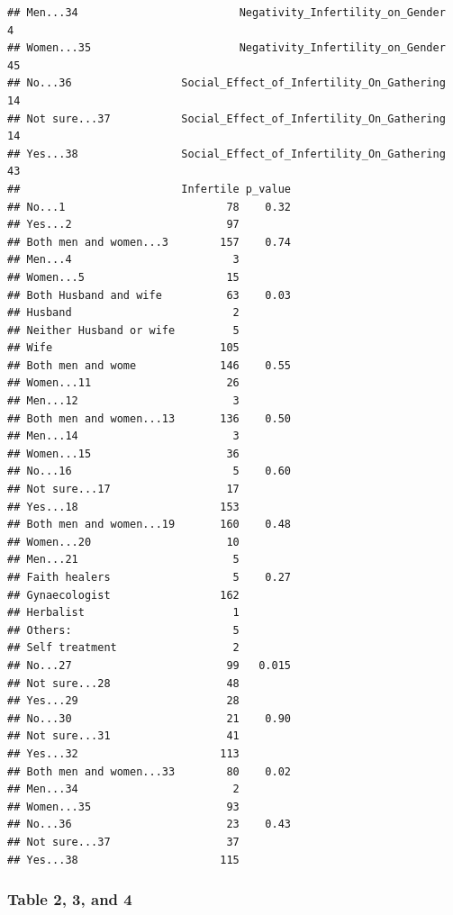 \documentclass[
]{article}
\begin{document}
\begin{verbatim}
## Men...34                         Negativity_Infertility_on_Gender       4
## Women...35                       Negativity_Infertility_on_Gender      45
## No...36                 Social_Effect_of_Infertility_On_Gathering      14
## Not sure...37           Social_Effect_of_Infertility_On_Gathering      14
## Yes...38                Social_Effect_of_Infertility_On_Gathering      43
##                         Infertile p_value
## No...1                         78    0.32
## Yes...2                        97        
## Both men and women...3        157    0.74
## Men...4                         3        
## Women...5                      15        
## Both Husband and wife          63    0.03
## Husband                         2        
## Neither Husband or wife         5        
## Wife                          105        
## Both men and wome             146    0.55
## Women...11                     26        
## Men...12                        3        
## Both men and women...13       136    0.50
## Men...14                        3        
## Women...15                     36        
## No...16                         5    0.60
## Not sure...17                  17        
## Yes...18                      153        
## Both men and women...19       160    0.48
## Women...20                     10        
## Men...21                        5        
## Faith healers                   5    0.27
## Gynaecologist                 162        
## Herbalist                       1        
## Others:                         5        
## Self treatment                  2        
## No...27                        99   0.015
## Not sure...28                  48        
## Yes...29                       28        
## No...30                        21    0.90
## Not sure...31                  41        
## Yes...32                      113        
## Both men and women...33        80    0.02
## Men...34                        2        
## Women...35                     93        
## No...36                        23    0.43
## Not sure...37                  37        
## Yes...38                      115
\end{verbatim}

\hypertarget{table-2-3-and-4}{%
\subsubsection{\texorpdfstring{\textbf{Table 2, 3, and
4}}{Table 2, 3, and 4}}\label{table-2-3-and-4}}
\end{document}
